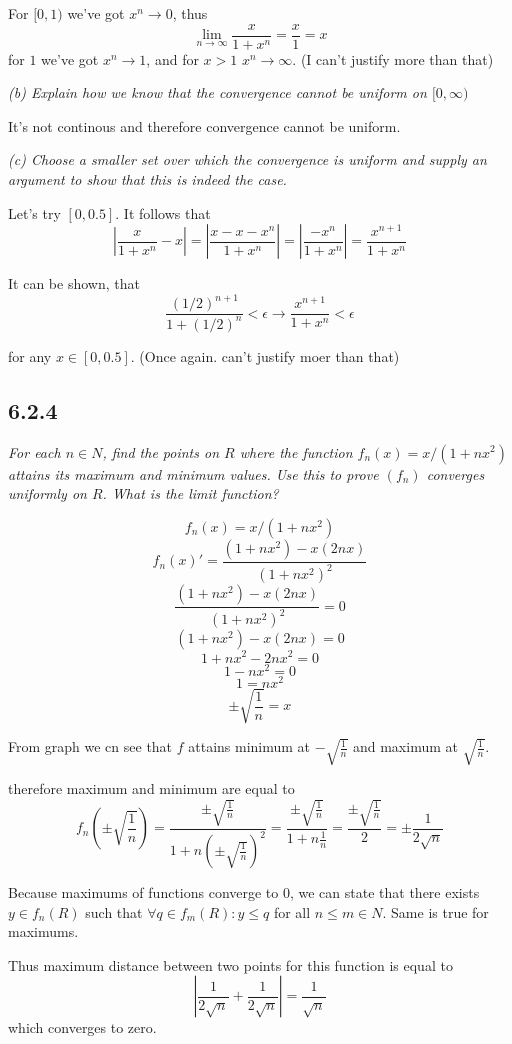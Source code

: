 \documentclass[11pt,oneside,titlepage]{book}
\begin{document}
For $[0, 1)$ we've got $x^n \to 0$, thus
$$\lim_{n \to \infty}{\frac{x}{1 + x^n}} = \frac{x}{1} = x$$
for $1$ we've got $x^n \to 1$, and for $x > 1$ $x^n \to \infty$.
(I can't justify more than that)

\textit{(b) Explain how we know that the convergence cannot be uniform
  on $[0, \infty)$}

It's not continous and therefore convergence cannot be uniform.

\textit{(c) Choose a smaller set over which the convergence is uniform and
  supply an argument to show that this is indeed the case.}

Let's try $[0, 0.5]$. It follows that
$$\left|\frac{x}{1 + x^n} - x\right|  =
\left|\frac{x - x - x^n}{1 + x^n}\right|  =
\left|\frac{ - x^n}{1 + x^n}\right|  =
\frac{ x^{n + 1}}{1 + x^n} 
$$

It can be shown, that
$$\frac{ (1/2)^{n + 1}}{1 + (1/2)^n} < \epsilon \to
\frac{ x^{n + 1}}{1 + x^n} < \epsilon
$$ 

for any $x \in [0, 0.5]$. (Once again. can't justify moer than that)


\subsection*{6.2.4}
\textit{For each $n \in N$, find the points on $R$ where the function
  $f_n(x) = x/(1 + nx^2)$ attains its maximum and minimum values. Use this
  to prove $(f_n)$ converges uniformly on $R$. What is the limit function?}

$$f_n(x) = x/(1 + nx^2)$$
$$f_n(x)' = \frac{(1 + nx^2) - x(2nx)}{(1 + nx^2)^2}$$
$$\frac{(1 + nx^2) - x(2nx)}{(1 + nx^2)^2} = 0$$
$$(1 + nx^2) - x(2nx) = 0$$
$$1 + nx^2 - 2nx^2 = 0$$
$$1 - nx^2 = 0$$
$$1 = nx^2$$
$$\pm \sqrt{\frac{1}{n}} = x$$

From graph we cn see that $f$ attains minimum at $-\sqrt{\frac{1}{n}}$
and maximum at $\sqrt{\frac{1}{n}}$.

therefore maximum and minimum are equal to 
$$f_n(\pm \sqrt{\frac{1}{n}}) = \frac{\pm \sqrt{\frac{1}{n}}}
{1 + n(\pm \sqrt{\frac{1}{n}})^2} =
\frac{\pm \sqrt{\frac{1}{n}}} {1 + n\frac{1}{n}} =
\frac{\pm \sqrt{\frac{1}{n}}} {2} =
\pm \frac{1}{2\sqrt{n}} $$

Because maximums of functions converge to 0, we can state that
there exists $y \in f_n(R)$
such that $\forall q \in f_m(R): y \leq q$ for all $n \leq m \in N$.
Same is true for maximums. 

Thus maximum distance between two points for this function is equal to
$$| \frac{1}{2\sqrt{n}} + \frac{1}{2\sqrt{n}}| = \frac{1}{\sqrt{n}}$$
which converges to zero.
\end{document}
